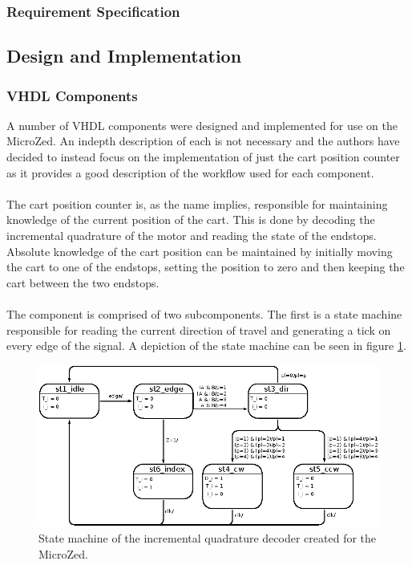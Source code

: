 \subsubsection{Requirement Specification} %
\label{ssub:controller_requirements}







\subsection{Design and Implementation} %
\label{sub:implementation}
\subsubsection{VHDL Components} %
\label{ssub:vhdl_components}
A number of VHDL components were designed and implemented for use on the MicroZed.
An indepth description of each is not necessary and the authors have decided to instead focus on the implementation of just the cart position counter as it provides a good description of the workflow used for each component.
\\~\\
The cart position counter is, as the name implies, responsible for maintaining knowledge of the current position of the cart.
This is done by decoding the incremental quadrature of the motor and reading the state of the endstops.
Absolute knowledge of the cart position can be maintained by initially moving the cart to one of the endstops, setting the position to zero and then keeping the cart between the two endstops.
\\~\\
The component is comprised of two subcomponents.
The first is a state machine responsible for reading the current direction of travel and generating a tick on every edge of the signal.
A depiction of the state machine can be seen in figure \ref{fig:quadstatemachine}.

\begin{figure}[h]
	\centering
	\includegraphics[width=.85\linewidth]{graphics/quad_state_machine}
	\caption{State machine of the incremental quadrature decoder created for the MicroZed.}
	\label{fig:quadstatemachine}
\end{figure}

